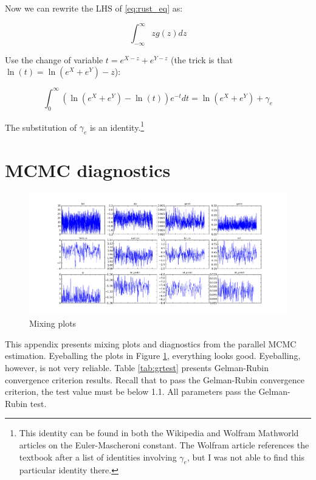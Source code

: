 Now we can rewrite the LHS of \eqref{eq:rust_eq} as:

\begin{equation}
    \int_{-\infty}^\infty z g(z) dz 
\end{equation}

Use the change of variable $t = e^{X - z} + e^{Y - z}$ (the trick is that $\ln(t) = \ln\left(e^X + e^Y\right) - z$):

\begin{equation}
    \int_{0}^\infty \left(\ln \left(e^X + e^Y\right) - \ln(t)\right) e^{-t} dt = \ln \left(e^X + e^Y\right) + \gamma_e
\end{equation}

The substitution of $\gamma_e$ is an identity.\footnote{This identity can be found in both the Wikipedia and Wolfram Mathworld articles on the Euler-Mascheroni constant.  The Wolfram article references the textbook \citet{whittaker1996course} after a list of identities involving $\gamma_e$, but I was not able to find this particular identity there.}

\section{MCMC diagnostics}
\label{sec:MCMC_diag}

\begin{figure}[!ht]
    \includegraphics[scale=0.35]{pics/params_plots_big.png}
    \caption{Mixing plots}
    \label{fig:mix}
\end{figure}

This appendix presents mixing plots and diagnostics from the parallel
MCMC estimation. Eyeballing the plots in Figure \ref{fig:mix}, everything looks good.  Eyeballing,
however, is not very reliable.
Table \ref{tab:grtest} presents Gelman-Rubin convergence criterion results. Recall that to pass the
Gelman-Rubin convergence criterion, the test value must be below 1.1.
All parameters pass the Gelman-Rubin test.

